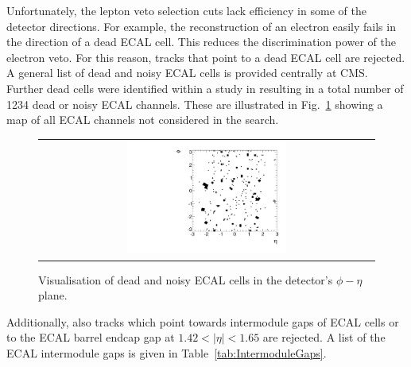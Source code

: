 Unfortunately, the lepton veto selection cuts lack efficiency in some of the detector directions.
For example, the reconstruction of an electron easily fails in the direction of a dead ECAL cell.
This reduces the discrimination power of the electron veto.
For this reason, tracks that point to a dead ECAL cell are rejected.
A general list of dead and noisy ECAL cells is provided centrally at CMS.
Further dead cells were identified within a study in \cite{bib:CMS:DT_8TeV} resulting in a total number of 1234 dead or noisy ECAL channels. 
These are illustrated in Fig.~\ref{fig:DeadECALmap} showing a map of all ECAL channels not considered in the search.
\begin{figure}[!t]
  \centering 
  \begin{tabular}{c}
    \includegraphics[width=0.49\textwidth]{figures/analysis/DeadECALMap.pdf}
  \end{tabular}
  \caption{Visualisation of dead and noisy ECAL cells in the detector's $\phi - \eta$ plane.}
  \label{fig:DeadECALmap}
\end{figure}

Additionally, also tracks which point towards intermodule gaps of ECAL cells or to the ECAL barrel endcap gap at $1.42<|\eta|<1.65$ are rejected.
A list of the ECAL intermodule gaps is given in Table~\ref{tab:IntermoduleGaps}.
\renewcommand{\arraystretch}{1.5}
\begin{table}[!hbt]
\centering
\caption{Intermodule ECAL gaps.}
\label{tab:IntermoduleGaps}
\end{table}  

